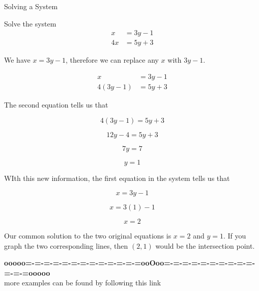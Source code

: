 \documentclass{ximera}
\begin{document}
\begin{example} Solving a System


Solve the system
\begin{align*}
x & = 3y - 1 \\
4x & = 5y + 3
\end{align*}

\begin{explanation}

We have $x = 3y - 1$, therefore we can replace any $x$ with $3y - 1$.  

\begin{align*}
x & = 3y - 1 \\
4(3y - 1) & = 5y + 3
\end{align*}


The second equation tells us that 


\[   4(3y - 1) = 5y + 3   \]

\[   12y- 4 = 5y + 3   \]


\[ 7y = 7 \]


\[ y = 1 \]

WIth this new information, the first equation in the system tells us that

\[ x = 3y - 1 \]

\[ x = 3(1) - 1 \]

\[ x = 2 \]

Our common solution to the two original equations is $x = 2$ and $y = 1$.  If you graph the two corresponding lines, then $(2, 1)$ would be the intersection point.

\end{explanation}
\end{example}









\begin{center}
\textbf{\textcolor{green!50!black}{ooooo=-=-=-=-=-=-=-=-=-=-=-=-=ooOoo=-=-=-=-=-=-=-=-=-=-=-=-=ooooo}} \\

more examples can be found by following this link\\ 

\end{center}
\end{document}
